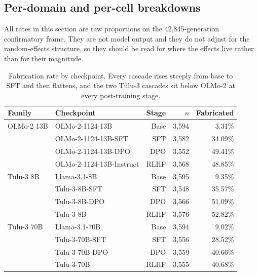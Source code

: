 




\subsection{Per-domain and per-cell breakdowns}


All rates in this section are raw proportions on the 42,845-generation
confirmatory frame. They are not model output and they do not adjust for the
random-effects structure, so they should be read for where the effects live
rather than for their magnitude.

\begin{table}[h]
\centering
\caption{Fabrication rate by checkpoint. Every cascade rises steeply from base
to SFT and then flattens, and the two Tülu-3 cascades sit below OLMo-2 at every
post-training stage.}
\label{tab:bymodel}
\small
\begin{tabular}{llrrr}
\toprule
Family & Checkpoint & Stage & $n$ & Fabricated \\
\midrule
OLMo-2 13B & OLMo-2-1124-13B          & Base & 3{,}594 &  3.31\% \\
           & OLMo-2-1124-13B-SFT      & SFT  & 3{,}582 & 34.09\% \\
           & OLMo-2-1124-13B-DPO      & DPO  & 3{,}552 & 49.41\% \\
           & OLMo-2-1124-13B-Instruct & RLHF & 3{,}568 & 48.85\% \\
\midrule
Tülu-3 8B  & Llama-3.1-8B             & Base & 3{,}595 &  9.35\% \\
           & Tulu-3-8B-SFT            & SFT  & 3{,}548 & 35.57\% \\
           & Tulu-3-8B-DPO            & DPO  & 3{,}566 & 51.09\% \\
           & Tulu-3-8B                & RLHF & 3{,}576 & 52.82\% \\
\midrule
Tülu-3 70B & Llama-3.1-70B            & Base & 3{,}594 &  9.02\% \\
           & Tulu-3-70B-SFT           & SFT  & 3{,}556 & 28.52\% \\
           & Tulu-3-70B-DPO           & DPO  & 3{,}559 & 40.66\% \\
           & Tulu-3-70B               & RLHF & 3{,}555 & 40.68\% \\
\bottomrule
\end{tabular}
\end{table}


